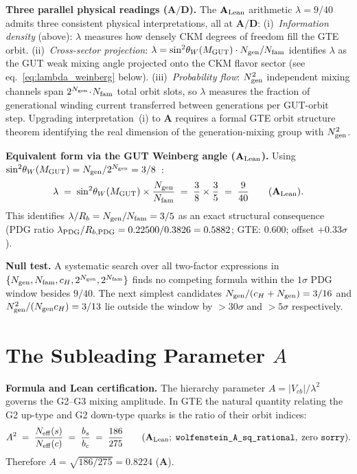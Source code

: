 \documentclass[11pt]{article}
\theoremstyle{remark}
\newcommand{\Ngen}{N_{\rm gen}}
\newcommand{\Nfam}{N_{\rm fam}}
\newcommand{\cH}{c_H}
\newcommand{\lean}[1]{%
  \penalty-100
  \begingroup\def\_{\textunderscore\allowbreak}\texttt{#1}\endgroup}
\newcommand{\lam}{\lambda}
\newcommand{\bc}{b_c}
\newcommand{\bs}{b_s}
\newcommand{\Rb}{R_b}
\newcommand{\sinwsq}{\sin^2\!\theta_W}
\newcommand{\CatA}{\textbf{A}}
\newcommand{\CatAL}{\ensuremath{\textbf{A}_{\rm Lean}}}
\newcommand{\CatAD}{\textbf{A/D}}
\begin{document}
\medskip

\textbf{Three parallel physical readings ($\CatAD$).}
The $\CatAL$ arithmetic $\lam = 9/40$ admits three consistent physical interpretations,
all at $\CatAD$:
(i)~\emph{Information density} (above): $\lam$ measures how densely CKM degrees of
freedom fill the GTE orbit.
(ii)~\emph{Cross-sector projection}: $\lam = \sinwsq(M_{\rm GUT})\cdot\Ngen/\Nfam$
identifies $\lam$ as the GUT weak mixing angle projected onto the CKM flavor sector
(see eq.~\eqref{eq:lambda_weinberg} below).
(iii)~\emph{Probability flow}: $\Ngen^2$ independent mixing channels span
$2^{\Ngen}\!\cdot\!\Nfam$ total orbit slots, so $\lam$ measures the fraction of
generational winding current transferred between generations per GUT-orbit step.
Upgrading interpretation~(i) to $\CatA$ requires a formal GTE orbit structure theorem
identifying the real dimension of the generation-mixing group with $\Ngen^2$.

\medskip

\textbf{Equivalent form via the GUT Weinberg angle ($\CatAL$).}
Using $\sinwsq(M_{\rm GUT}) = \Ngen/2^{\Ngen} = 3/8$~\cite{SpivackWeinberg}:
\begin{equation}\label{eq:lambda_weinberg}
  \lam \;=\; \sinwsq(M_{\rm GUT}) \times \frac{\Ngen}{\Nfam}
           \;=\; \frac{3}{8}\times\frac{3}{5}
           \;=\; \frac{9}{40} \qquad (\CatAL).
\end{equation}
This identifies $\lam/\Rb = \Ngen/\Nfam = 3/5$ as an exact structural consequence
(PDG ratio $\lam_{\rm PDG}/R_{b,\rm PDG} = 0.22500/0.3826 = 0.5882$; GTE: $0.600$;
offset $+0.33\sigma$).

\medskip

\textbf{Null test.}
A systematic search over all two-factor expressions in
$\{\Ngen, \Nfam, \cH, 2^{\Ngen}, 2^{\Nfam}\}$ finds no competing formula within the
$1\sigma$ PDG window besides $9/40$.
The next simplest candidates $\Ngen/(\cH+\Ngen) = 3/16$ and $\Ngen^2/(\Ngen\cH) = 3/13$
lie outside the window by $>30\sigma$ and $>5\sigma$ respectively.

\section{The Subleading Parameter \boldmath$A$}
\label{sec:A}

\textbf{Formula and Lean certification.}
The hierarchy parameter $A = |V_{cb}|/\lam^2$ governs the G2--G3 mixing amplitude.
In GTE the natural quantity relating the G2 up-type and G2 down-type quarks is the
ratio of their orbit indices:
\begin{equation}\label{eq:A_sq}
  A^2 \;=\; \frac{N_{\rm eff}(s)}{N_{\rm eff}(c)} \;=\; \frac{\bs}{\bc} \;=\; \frac{186}{275}
  \qquad (\CatAL;\;\lean{wolfenstein\_A\_sq\_rational},\;\text{zero }\texttt{sorry}).
\end{equation}
Therefore $A = \sqrt{186/275} = 0.8224$ ($\CatA$).
\end{document}
